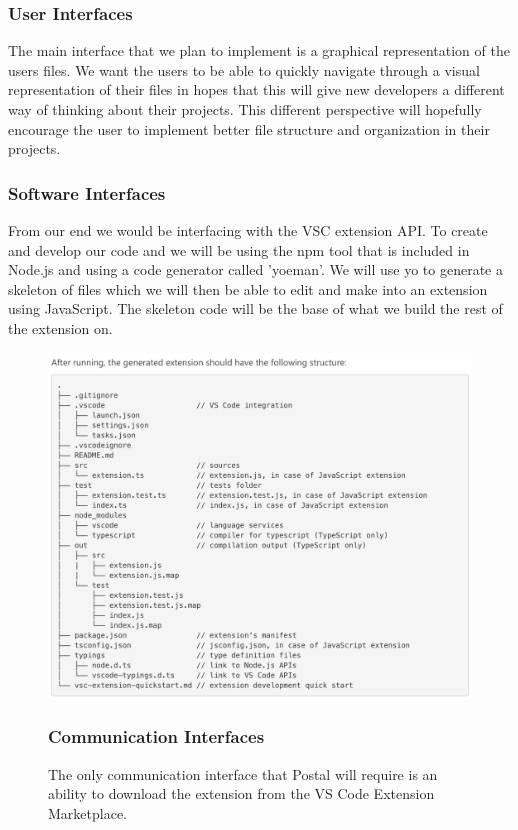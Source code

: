 \documentclass[letterpaper,10pt,titlepage,draftclsnofoot,onecolumn,onesided] {IEEEtran}
\begin{document}
\subsubsection{User Interfaces}
The main interface that we plan to implement is a graphical representation of the users files. 
We want the users to be able to quickly navigate through a visual representation of their files in hopes that this will give new developers a different way of thinking about their projects.
This different perspective will hopefully encourage the user to implement better file structure and organization in their projects.

\subsubsection{Software Interfaces}
From our end we would be interfacing with the VSC extension API. To create and develop our code and we will be using the npm tool that is included in Node.js and using a code generator called 'yoeman'. We will use yo to generate a skeleton of files which we will then be able to edit and make into an extension using JavaScript. The skeleton code will be the base of what we build the rest of the extension on. 

\begin{figure}
\centering
\includegraphics[scale=0.5]{fileStructure.png}
\subsubsection{Communication Interfaces}
\caption{The only communication interface that Postal will require is an ability to download the extension from the VS Code Extension Marketplace.}
\end{figure}
\end{document}

